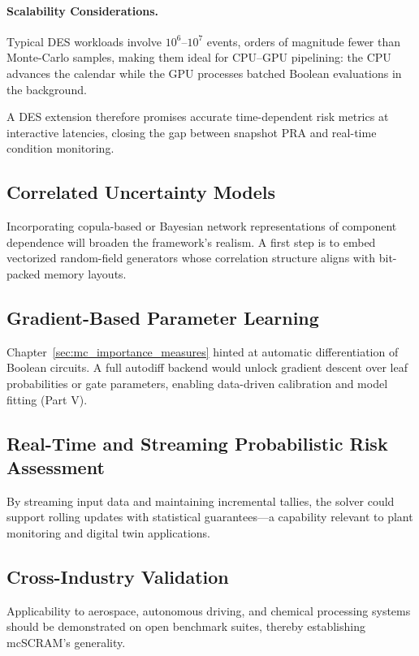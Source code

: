 \paragraph*{Scalability Considerations.}  Typical DES workloads involve $10^6$–$10^7$
events, orders of magnitude fewer than Monte-Carlo samples, making them ideal
for CPU–GPU pipelining: the CPU advances the calendar while the GPU processes
batched Boolean evaluations in the background.

A DES extension therefore promises accurate time-dependent risk metrics at
interactive latencies, closing the gap between snapshot PRA and real-time
condition monitoring.

\subsection{Correlated Uncertainty Models}
Incorporating copula-based or Bayesian network representations of component
dependence will broaden the framework’s realism.  A first step is to embed
vectorized random-field generators whose correlation structure aligns with
bit-packed memory layouts.

\subsection{Gradient-Based Parameter Learning}
Chapter~\ref{sec:mc_importance_measures} hinted at automatic differentiation of
Boolean circuits.  A full autodiff backend would unlock gradient descent over
leaf probabilities or gate parameters, enabling data-driven calibration and
model fitting (Part V).

\subsection{Real-Time and Streaming Probabilistic Risk Assessment}
By streaming input data and maintaining incremental tallies, the solver could
support rolling updates with statistical guarantees—a capability relevant to
plant monitoring and digital twin applications.

\subsection{Cross-Industry Validation}
Applicability to aerospace, autonomous driving, and chemical processing systems
should be demonstrated on open benchmark suites, thereby establishing
mcSCRAM’s generality.

